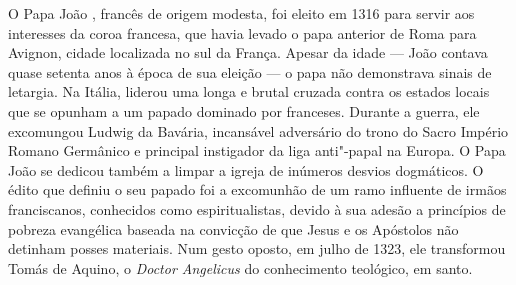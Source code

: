 O Papa João , francês de origem modesta, foi eleito em 1316 para
servir aos interesses da coroa francesa, que havia levado o papa
anterior de Roma para Avignon, cidade localizada no sul da França.
Apesar da idade --- João  contava quase setenta anos à época de sua
eleição --- o papa não demonstrava sinais de letargia. Na Itália, liderou
uma longa e brutal cruzada contra os estados locais que se opunham a um
papado dominado por franceses. Durante a guerra, ele excomungou Ludwig
da Bavária, incansável adversário do trono do Sacro Império Romano
Germânico e principal instigador da liga anti"-papal na Europa. O Papa
João  se dedicou também a limpar a igreja de inúmeros desvios
dogmáticos. O édito que definiu o seu papado foi a excomunhão de um ramo
influente de irmãos franciscanos, conhecidos como espiritualistas,
devido à sua adesão a princípios de pobreza evangélica baseada na
convicção de que Jesus e os Apóstolos não detinham posses materiais. Num
gesto oposto, em julho de 1323, ele transformou Tomás de Aquino, o
\textit{Doctor Angelicus} do conhecimento teológico, em santo.

